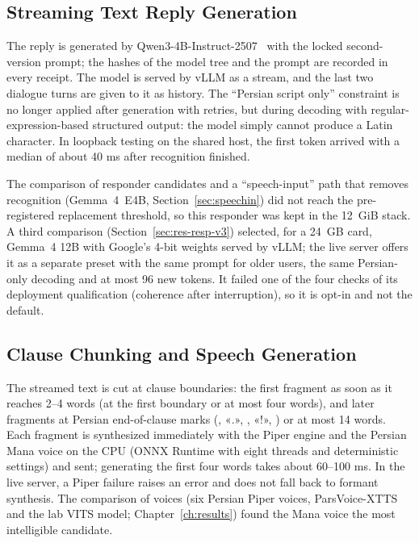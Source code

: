 \subsection{Streaming Text Reply Generation}

The reply is generated by Qwen3-4B-Instruct-2507~\cite{qwen2025qwen3} with the locked
second-version prompt; the hashes of the model tree and the prompt are recorded in every
receipt. The model is served by vLLM as a stream, and the last two dialogue turns are
given to it as history. The ``Persian script only'' constraint is no longer applied
after generation with retries, but during decoding with regular-expression-based
structured output: the model simply cannot produce a Latin character. In loopback
testing on the shared host, the first token arrived with a median of about 40 ms after
recognition finished.

The comparison of responder candidates and a ``speech-input'' path that removes
recognition (Gemma~4~E4B, Section~\ref{sec:speechin}) did not reach the pre-registered
replacement threshold, so this responder was kept in the 12~GiB stack. A third comparison
(Section~\ref{sec:res-resp-v3}) selected, for a 24~GB card, Gemma~4 12B with Google's 4-bit
weights served by vLLM; the live server offers it as a separate preset with the same prompt for
older users, the same Persian-only decoding and at most 96 new tokens. It failed one of the four
checks of its deployment qualification (coherence after interruption), so it is opt-in and not the
default.

\subsection{Clause Chunking and Speech Generation}

The streamed text is cut at clause boundaries: the first fragment as soon as it reaches
2--4 words (at the first boundary or at most four words), and later fragments at
Persian end-of-clause marks (, «.», , «!», ) or at most 14 words. Each
fragment is synthesized immediately with the Piper engine and the Persian Mana voice on
the CPU (ONNX Runtime with eight threads and deterministic settings) and sent;
generating the first four words takes about 60--100 ms. In the live server, a Piper
failure raises an error and does not fall back to formant synthesis. The comparison of
voices (six Persian Piper voices, ParsVoice-XTTS and the lab VITS model;
Chapter~\ref{ch:results}) found the Mana voice the most intelligible candidate.

